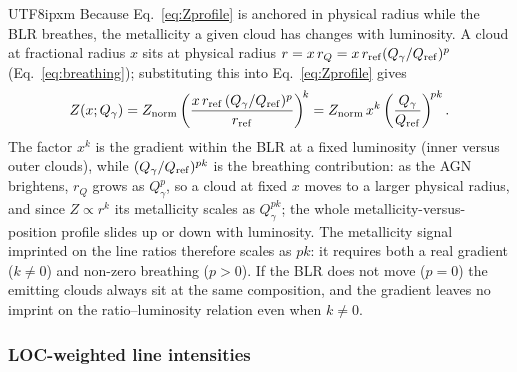 \documentclass[linenumbers,trackchanges]{aastex701}
\begin{document}
\begin{CJK*}{UTF8}{ipxm}
Because Eq.~\ref{eq:Zprofile} is anchored in physical radius while the BLR breathes, the
metallicity a given cloud has changes with luminosity.  A cloud at fractional radius $x$ sits at
physical radius $r=x\,r_Q=x\,r_{\rm ref}(Q_\gamma/Q_{\rm ref})^{p}$ (Eq.~\ref{eq:breathing});
substituting this into Eq.~\ref{eq:Zprofile} gives
\begin{equation}
    Z(x;Q_\gamma)
    = Z_{\rm norm}\left(\frac{x\,r_{\rm ref}\,(Q_\gamma/Q_{\rm ref})^{p}}{r_{\rm ref}}\right)^{\!k}
    = Z_{\rm norm}\,x^{k}\left(\frac{Q_\gamma}{Q_{\rm ref}}\right)^{\!pk}.
    \label{eq:Zx}
\end{equation}
The factor $x^{k}$ is the gradient within the BLR at a fixed luminosity (inner versus
outer clouds), while $(Q_\gamma/Q_{\rm ref})^{pk}$ is the breathing contribution: as the AGN
brightens, $r_Q$ grows as $Q_\gamma^{p}$, so a cloud at fixed $x$ moves to a larger physical
radius, and since $Z\propto r^{k}$ its metallicity scales as $Q_\gamma^{pk}$; the whole
metallicity-versus-position profile slides up or down with luminosity.  The metallicity signal
imprinted on the line ratios therefore scales as $pk$: it requires both a real gradient
($k\neq0$) and non-zero breathing ($p>0$).  If the BLR does not move ($p=0$) the emitting
clouds always sit at the same composition, and the gradient leaves no imprint on the
ratio--luminosity relation even when $k\neq0$.

\subsubsection{LOC-weighted line intensities}


\end{CJK*}
\end{document}
